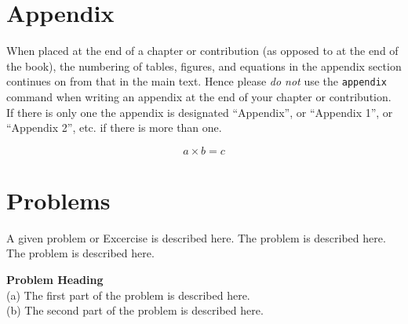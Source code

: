 \section*{Appendix}
%
When placed at the end of a chapter or contribution (as opposed to at the end of the book), the numbering of tables, figures, and equations in the appendix section continues on from that in the main text. Hence please \textit{do not} use the \verb|appendix| command when writing an appendix at the end of your chapter or contribution. If there is only one the appendix is designated ``Appendix'', or ``Appendix 1'', or ``Appendix 2'', etc. if there is more than one.

\begin{equation}
a \times b = c
\end{equation}
\section*{Problems}
%
\begin{prob}
\label{prob1}
A given problem or Excercise is described here. The
problem is described here. The problem is described here.
\end{prob}

\begin{prob}
\label{prob2}
\textbf{Problem Heading}\\
(a) The first part of the problem is described here.\\
(b) The second part of the problem is described here.
\end{prob}

%
